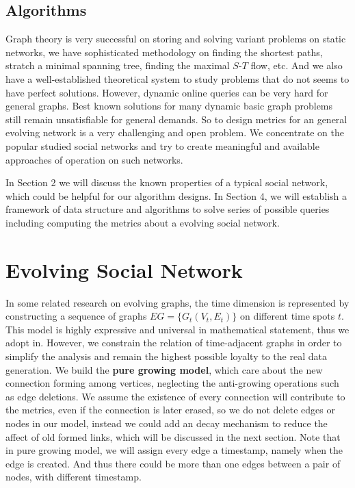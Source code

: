 \documentclass[12pt,abstract=true]{scrartcl}
\numberwithin{equation}{section}
\theoremstyle{definition}   \newtheorem{definition}{Definition}[section]
\theoremstyle{plain}        \newtheorem{theorem}{Theorem}[section]
\theoremstyle{plain}        \newtheorem{observation}{Observation}[section]
\theoremstyle{plain}        \newtheorem{fact}{Fact}[section]
\theoremstyle{plain}        \newtheorem{claim}{Claim}[section]
\theoremstyle{plain}        \newtheorem{lemma}[theorem]{Lemma}
\theoremstyle{plain}        \newtheorem{corollary}[theorem]{Corollary}
\theoremstyle{remark}       \newtheorem{example}{Example}[section]
\theoremstyle{remark}       \newtheorem{remark}{Remark}[section]
\begin{document}
\subsection{Algorithms}
Graph theory is very successful on storing and solving variant problems on
static networks, we have sophisticated methodology on finding the shortest
paths, stratch a minimal spanning tree, finding the maximal $S$-$T$ flow, etc.
And we also have a well-established theoretical system to study problems that
do not seems to have perfect solutions. However, dynamic online queries can be
very hard for general graphs. Best known solutions for many dynamic basic graph
problems still remain unsatisfiable for general demands. So to design metrics
for an general evolving network is a very challenging and open problem. We
concentrate on the popular studied social networks and try to create meaningful
and available approaches of operation on such networks.

In Section 2 we will discuss the known properties of a typical social network,
which could be helpful for our algorithm designs. In Section 4, we will
establish a framework of data structure and algorithms to solve series of
possible queries including computing the metrics about a evolving social
network.

\section{Evolving Social Network}
In some related research on evolving graphs, the time dimension is represented
by constructing a sequence of graphs $EG=\{G_t(V_t,E_t)\}$ on different time
spots $t$. This model is highly expressive and universal in mathematical
statement, thus we adopt in. However, we constrain the relation of
time-adjacent graphs in order to simplify the analysis and remain the highest
possible loyalty to the real data generation. We build the \textbf{pure growing
model}, which care about the new connection forming among vertices, neglecting
the anti-growing operations such as edge deletions. We assume the existence of
every connection will contribute to the metrics, even if the connection is
later erased, so we do not delete edges or nodes in our model, instead we could
add an decay mechanism to reduce the affect of old formed links, which will be
discussed in the next section. Note that in pure growing model, we will assign
every edge a timestamp, namely when the edge is created. And thus there could
be more than one edges between a pair of nodes, with different timestamp.
\end{document}
